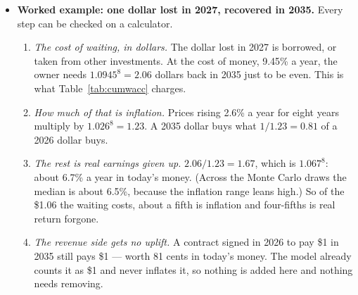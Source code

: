 \documentclass[11pt,letterpaper]{article}
\begin{document}
\begin{itemize}
\begin{itemize}
  \item \emph{Not added to revenue:} receipts are counted in today's prices --- multi-year contracts are fixed in dollars when signed, AI unit prices are falling, and the sector ceilings are built from today's prices. So no inflation uplift is given to revenue.
  \item \emph{What it changes:} the returns investors actually keep. Inflation is taken at 2.0 / 2.6 / 3.7\% a year --- the Federal Reserve's 2\% goal, September core CPI (2.6\%) and headline CPI (3.7\%)~\cite{ref:fed_goal,ref:bls_cpi_sep26}. After it, an ordinary return is about 6.5\%; flat spending averages about $-$6.5\% a year in 2035 and an arms race about $-$12\% (Table~\ref{tab:roiyear}, bottom).
  \item \emph{Fixed prices, rising costs:} a fixed-price contract signed in 2026 is worth about a fifth less in real terms by 2035, while power, labor and site costs rise with prices. The model holds facility opex at its 2026 share of gross stock; letting it rise with inflation would add about \$16B to the 2030 carry and \$50B by 2035 on the flat path. That is left out of the base (no source yet for the escalation clauses) and shown here as a sensitivity: it makes the result worse, not better.
  \end{itemize}
\item \textbf{Worked example: one dollar lost in 2027, recovered in 2035.} Every step can be checked on a calculator.
  \begin{enumerate}
  \item \emph{The cost of waiting, in dollars.} The dollar lost in 2027 is borrowed, or taken from other investments. At the cost of money, 9.45\% a year, the owner needs $1.0945^{8}=2.06$ dollars back in 2035 just to be even. This is what Table~\ref{tab:cumwacc} charges.
  \item \emph{How much of that is inflation.} Prices rising 2.6\% a year for eight years multiply by $1.026^{8}=1.23$. A 2035 dollar buys what $1/1.23=0.81$ of a 2026 dollar buys.
  \item \emph{The rest is real earnings given up.} $2.06/1.23=1.67$, which is $1.067^{8}$: about 6.7\% a year in today's money. (Across the Monte Carlo draws the median is about 6.5\%, because the inflation range leans high.) So of the \$1.06 the waiting costs, about a fifth is inflation and four-fifths is real return forgone.
  \item \emph{The revenue side gets no uplift.} A contract signed in 2026 to pay \$1 in 2035 still pays \$1 --- worth 81 cents in today's money. The model already counts it as \$1 and never inflates it, so nothing is added here and nothing needs removing.

\end{enumerate}
\end{itemize}
\end{document}
